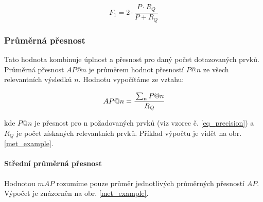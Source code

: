 \documentclass[12pt]{article}
\begin{document}
\begin{equation}
\label{eq_fmeasure}
{ F }_{ 1 }=2\cdot \frac { P\cdot { R }_{ Q } }{ P+{ R }_{ Q } }
\end{equation}

\subsubsection{Průměrná přesnost}
\label{met_AP}
Tato hodnota kombinuje úplnost a přesnost pro daný počet dotazovaných prvků. Průměrná přesnost\cite{Average_precision} $AP@n$ je průměrem hodnot přesností $P@n$ ze všech relevantních výsledků $n$. Hodnotu vypočítáme ze vztahu:

\begin{equation}
AP@n=\cfrac { \sum _{ n }^{  }{ P@n }  }{ R_Q } 
\end{equation}

kde $P@n$ je přesnost pro n požadovaných prvků (viz vzorec č. \ref{eq_precision}) a $R_Q$ je počet získaných relevantních prvků. Příklad výpočtu je vidět na obr. \ref{met_example}.

\paragraph{Střední průměrná přesnost}
\label{met_MAP}
Hodnotou $mAP$ rozumíme pouze průměr jednotlivých průměrných přesností $AP$. Výpočet je znázorněn na obr. \ref{met_example}.
\end{document}
